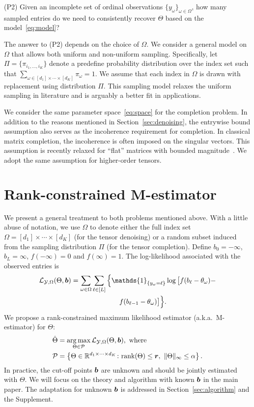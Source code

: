 \documentclass{article}
\theoremstyle{plain}
\theoremstyle{definition}
\begin{document}
(P2) Given an incomplete set of ordinal observations $\{y_{\omega}\}_{\omega\in\Omega}$, how many sampled entries do we need to consistently recover $\Theta$ based on the model~\eqref{eq:model}?

The answer to (P2) depends on the choice of $\Omega$. We consider a general model on $\Omega$ that allows both uniform and non-uniform sampling. Specifically, let $\Pi=\{\pi_{i_1,\ldots,i_K}\}$ denote a predefine probability distribution over the index set such that $\sum_{\omega\in[d_1]\times \cdots \times [d_K]} \pi_\omega =1$. We assume that each index in $\Omega$ is drawn with replacement using distribution $\Pi$. This sampling model relaxes the uniform sampling in literature and is arguably a better fit in applications.

We consider the same parameter space~\eqref{eq:space} for the completion problem. In addition to the reasons mentioned in Section~\ref{sec:denoising}, the entrywise bound assumption also serves as the incoherence requirement for completion. In classical matrix completion, the incoherence is often imposed on the singular vectors. This assumption is recently relaxed for ``flat'' matrices with bounded magnitude~\cite{negahban2011estimation,cai2013max,bhaskar20151}. We adopt the same assumption for higher-order tensors.

\section{Rank-constrained M-estimator}\label{sec:theory}
\vspace{-.1cm}
We present a general treatment to both problems mentioned above. With a little abuse of notation, we use $\Omega$ to denote either the full index set $\Omega=[d_1]\times \cdots \times [d_K]$ (for the tensor denoising) or a random subset induced from the sampling distribution $\Pi$ (for the tensor completion). Define $b_0=-\infty$, $b_L=\infty$, $f(-\infty)=0$ and $f(\infty)=1$. The log-likelihood associated with the observed entries is
\begin{align}\label{eq:objective}
\logl(\Theta, \mb)&=\sum_{\omega\in\Omega}\sum_{\ell\in[L]} \Big\{\mathds{1}_{\{y_\omega=\ell\}} \log \big[f(b_\ell-\theta_\omega)- \notag \\
&\quad \quad \quad \quad \quad \quad \quad  f(b_{\ell-1}-\theta_\omega)\big]\Big\}.
\end{align}
We propose a rank-constrained maximum likelihood estimator (a.k.a.\ M-estimator) for $\Theta$:
\begin{align}\label{eq:estimator}
\hat \Theta&=\argmax_{\Theta\in \tP}\logl(\Theta, \mb),\ \text{where}\notag \\
\tP&=\left\{\Theta\in\mathbb{R}^{d_1\times \cdots \times d_K} \colon \text{rank}(\Theta)\leq \mr,\ \mnormSize{}{\Theta}\leq \alpha\right\}.
 \end{align}
In practice, the cut-off points $\bm{b}$ are unknown and should be jointly estimated with $\Theta$. We will focus on the theory and algorithm with known $\bm{b}$ in the main paper. The adaptation for unknown $\bm{b}$ is addressed in Section~\ref{sec:algorithm} and the Supplement.
\end{document}
